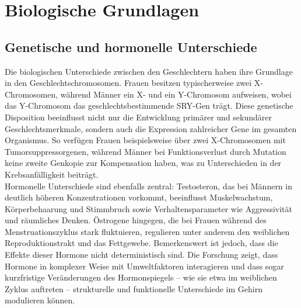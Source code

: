 \documentclass[12pt,a4paper]{article}
\begin{document}
	\section{Biologische Grundlagen}
	\subsection{Genetische und hormonelle Unterschiede}
	Die biologischen Unterschiede zwischen den Geschlechtern haben ihre Grundlage in den Geschlechtschromosomen. Frauen besitzen typischerweise zwei X-Chromosomen, während Männer ein X- und ein Y-Chromosom aufweisen, wobei das Y-Chromosom das geschlechtsbestimmende SRY-Gen trägt. Diese genetische Disposition beeinflusst nicht nur die Entwicklung primärer und sekundärer Geschlechtsmerkmale, sondern auch die Expression zahlreicher Gene im gesamten Organismus. So verfügen Frauen beispielsweise über zwei X-Chromosomen mit Tumorsuppressorgenen, während Männer bei Funktionsverlust durch Mutation keine zweite Genkopie zur Kompensation haben, was zu Unterschieden in der Krebsanfälligkeit beiträgt. \cite{Hasenburg2025}\\
	Hormonelle Unterschiede sind ebenfalls zentral: Testosteron, das bei Männern in deutlich höheren Konzentrationen vorkommt, beeinflusst Muskelwachstum, Körperbehaarung und Stimmbruch sowie Verhaltensparameter wie Aggressivität und räumliches Denken. Östrogene hingegen, die bei Frauen während des Menstruationszyklus stark fluktuieren, regulieren unter anderem den weiblichen Reproduktionstrakt und das Fettgewebe. Bemerkenswert ist jedoch, dass die Effekte dieser Hormone nicht deterministisch sind. Die Forschung zeigt, dass Hormone in komplexer Weise mit Umweltfaktoren interagieren und dass sogar kurzfristige Veränderungen des Hormonspiegels -- wie sie etwa im weiblichen Zyklus auftreten -- strukturelle und funktionelle Unterschiede im Gehirn modulieren können. \cite{Valk2024}
	
\end{document}
